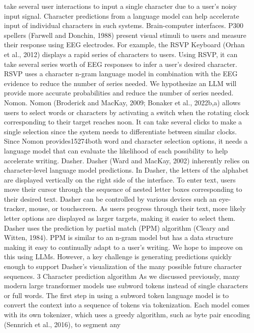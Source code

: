 take several user interactions to input a single character due to a user’s noisy input signal. Character
predictions from a language model can help accelerate input of individual characters in such systems.
Brain-computer interfaces. P300 spellers (Farwell and Donchin, 1988) present visual stimuli to
users and measure their response using EEG electrodes. For example, the RSVP Keyboard (Orhan
et al., 2012) displays a rapid series of characters to
users. Using RSVP, it can take several series worth
of EEG responses to infer a user’s desired character.
RSVP uses a character n-gram language model in
combination with the EEG evidence to reduce the
number of series needed. We hypothesize an LLM
will provide more accurate probabilities and reduce
the number of series needed.
Nomon. Nomon (Broderick and MacKay, 2009;
Bonaker et al., 2022b,a) allows users to select
words or characters by activating a switch when the
rotating clock corresponding to their target reaches
noon. It can take several clicks to make a single
selection since the system needs to differentiate
between similar clocks. Since Nomon provides15274both word and character selection options, it needs
a language model that can evaluate the likelihood
of each possibility to help accelerate writing.
Dasher. Dasher (Ward and MacKay, 2002) inherently relies on character-level language model
predictions. In Dasher, the letters of the alphabet
are displayed vertically on the right side of the
interface. To enter text, users move their cursor
through the sequence of nested letter boxes corresponding to their desired text. Dasher can be
controlled by various devices such an eye-tracker,
mouse, or touchscreen. As users progress through
their text, more likely letter options are displayed
as larger targets, making it easier to select them.
Dasher uses the prediction by partial match
(PPM) algorithm (Cleary and Witten, 1984). PPM
is similar to an n-gram model but has a data structure making it easy to continually adapt to a user’s
writing. We hope to improve on this using LLMs.
However, a key challenge is generating predictions
quickly enough to support Dasher’s visualization
of the many possible future character sequences.
3 Character prediction algorithm
As we discussed previously, many modern large
transformer models use subword tokens instead of
single characters or full words. The first step in using a subword token language model is to convert
the context into a sequence of tokens via tokenization. Each model comes with its own tokenizer,
which uses a greedy algorithm, such as byte pair
encoding (Sennrich et al., 2016), to segment any
